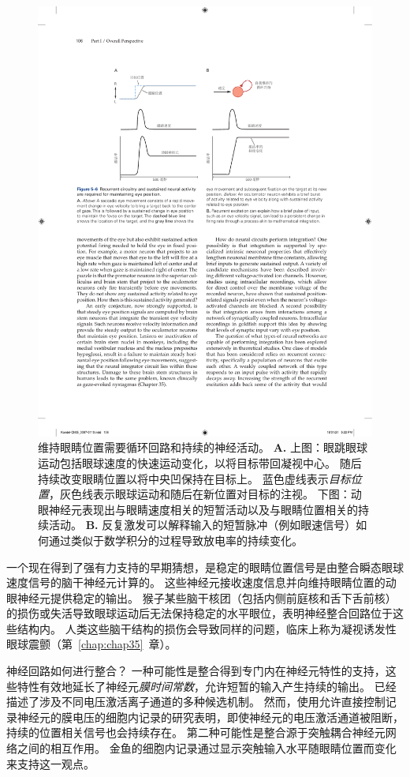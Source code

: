 \begin{figure}[htbp]
	\centering
	\includegraphics[width=0.9\linewidth]{chap05/fig_5_6}
	\caption{维持眼睛位置需要循环回路和持续的神经活动。
		\textbf{A.} 上图：眼跳眼球运动包括眼球速度的快速运动变化，以将目标带回凝视中心。
		随后持续改变眼睛位置以将中央凹保持在目标上。
		蓝色虚线表示\textit{目标位置}，灰色线表示眼球运动和随后在新位置对目标的注视。
		下图：动眼神经元表现出与眼睛速度相关的短暂活动以及与眼睛位置相关的持续活动。
		\textbf{B.} 反复激发可以解释输入的短暂脉冲（例如眼速信号）如何通过类似于数学积分的过程导致放电率的持续变化。}
	\label{fig:5_6}
\end{figure}


一个现在得到了强有力支持的早期猜想，是稳定的眼睛位置信号是由整合瞬态眼球速度信号的脑干神经元计算的。 
这些神经元接收速度信息并向维持眼睛位置的动眼神经元提供稳定的输出。 
猴子某些脑干核团（包括内侧前庭核和舌下舌前核）的损伤或失活导致眼球运动后无法保持稳定的水平眼位，表明神经整合回路位于这些结构内。 
人类这些脑干结构的损伤会导致同样的问题，临床上称为凝视诱发性眼球震颤（第~\ref{chap:chap35}~章）。


神经回路如何进行整合？
一种可能性是整合得到专门内在神经元特性的支持，这些特性有效地延长了神经元\textit{膜时间常数}，允许短暂的输入产生持续的输出。
已经描述了涉及不同电压激活离子通道的多种候选机制。 
然而，使用允许直接控制记录神经元的膜电压的细胞内记录的研究表明，即使神经元的电压激活通道被阻断，持续的位置相关信号也会持续存在。 
第二种可能性是整合源于突触耦合神经元网络之间的相互作用。 
金鱼的细胞内记录通过显示突触输入水平随眼睛位置而变化来支持这一观点。


